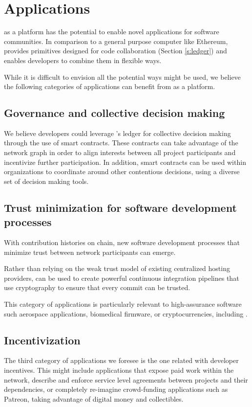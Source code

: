\section{Applications}

\Oscoin{} as a platform has the potential to enable novel applications for
software communities. In comparison to a general purpose computer like
Ethereum, \oscoin{} provides primitives designed for code collaboration
(Section \ref{s:ledger}) and enables developers to combine them in flexible ways.

While it is difficult to envision all the potential ways \oscoin{} might be used, we
believe the following categories of applications can benefit from \oscoin{}
as a platform.

\subsection{Governance and collective decision making}

We believe developers could leverage \oscoin{}’s ledger for collective decision
making through the use of smart contracts. These contracts can take advantage of the
network graph in order to align interests between all project participants and
incentivize further participation. In addition, smart contracts can be used
within organizations to coordinate around other contentious decisions, using a
diverse set of decision making tools.

\subsection{Trust minimization for software development processes}
With contribution histories on chain, new software development processes that
minimize trust between network participants can emerge.

Rather than relying on the weak trust model of existing centralized hosting
providers, \oscoin{} can be used to create powerful continuous integration
pipelines that use cryptography to ensure that every commit can be trusted.

This category of applications is particularly relevant to high-assurance
software such aerospace applications, biomedical firmware, or cryptocurrencies,
including \oscoin{}.

\subsection{Incentivization}
The third category of applications we foresee is the one related with
developer incentives. This might include applications that expose paid work
within the \oscoin{} network, describe and enforce service level agreements
between projects and their dependencies, or completely re-imagine crowd-funding
applications such as Patreon, taking advantage of digital money and collectibles.

